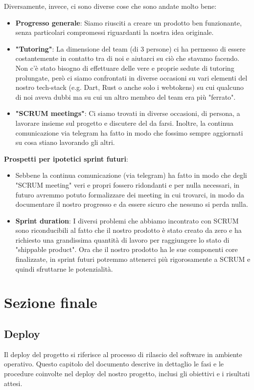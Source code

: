 \documentclass{article}
\begin{document}
Diversamente, invece, ci sono diverse cose che sono andate molto bene:
\begin{itemize}
    \item \textbf{Progresso generale}: Siamo riusciti a creare un prodotto ben funzionante, senza particolari compromessi riguardanti la nostra idea originale. 
    \item \textbf{"Tutoring"}: La dimensione del team (di 3 persone) ci ha permesso di essere costantemente in contatto tra di noi e aiutarci su ciò che stavamo facendo. Non c'è stato bisogno di effettuare delle vere e proprie sedute di tutoring prolungate, però ci siamo confrontati in diverse occasioni su vari elementi del nostro tech-stack (e.g. Dart, Rust o anche solo i webtokens) su cui qualcuno di noi aveva dubbi ma su cui un altro membro del team era più "ferrato".
    \item \textbf{"SCRUM meetings"}: Ci siamo trovati in diverse occasioni, di persona, a lavorare insieme sul progetto e discutere del da farsi. Inoltre, la continua comunicazione via telegram ha fatto in modo che fossimo sempre aggiornati su cosa stiano lavorando gli altri.
\end{itemize}

\textbf{Prospetti per ipotetici sprint futuri}:
\begin{itemize}
    \item Sebbene la continua comunicazione (via telegram) ha fatto in modo che degli "SCRUM meeting" veri e propri fossero ridondanti e per nulla necessari, in futuro avremmo potuto formalizzare dei meeting in cui trovarci, in modo da documentare il nostro progresso e da essere sicuro che nessuno si perda nulla. 
    \item \textbf{Sprint duration}: I diversi problemi che abbiamo incontrato con SCRUM sono riconducibili al fatto che il nostro prodotto è stato creato da zero e ha richiesto una grandissima quantità di lavoro per raggiungere lo stato di "shippable product". Ora che il nostro prodotto ha le sue componenti core finalizzate, in sprint futuri potremmo attenerci più rigorosamente a SCRUM e quindi sfruttarne le potenzialità. 
\end{itemize}

\clearpage

\section{Sezione finale}
\subsection{Deploy}
Il deploy del progetto si riferisce al processo di rilascio del software in ambiente operativo. Questo capitolo del documento descrive in dettaglio le fasi e le procedure coinvolte nel deploy del nostro progetto, inclusi gli obiettivi e i risultati attesi.
\end{document}
